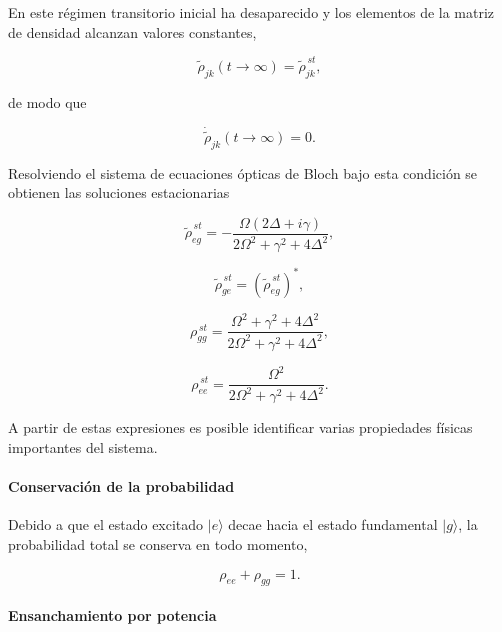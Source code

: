 \documentclass[11pt]{report}
\begin{document}
En este régimen transitorio inicial ha desaparecido y los elementos de la matriz de densidad alcanzan valores constantes,

\begin{equation}
\tilde{\rho}_{jk}(t \to \infty) = \tilde{\rho}^{\,st}_{jk},
\end{equation}

de modo que

\begin{equation}
\dot{\tilde{\rho}}_{jk}(t\to\infty)=0 .
\end{equation}

Resolviendo el sistema de ecuaciones ópticas de Bloch bajo esta condición se obtienen las soluciones estacionarias

\begin{equation}
\tilde{\rho}^{\,st}_{eg} =
-\frac{\Omega\left(2\Delta+i\gamma\right)}
{2\Omega^2+\gamma^2+4\Delta^2},
\end{equation}

\begin{equation}
\tilde{\rho}^{\,st}_{ge} =
\left(\tilde{\rho}^{\,st}_{eg}\right)^*,
\end{equation}

\begin{equation}
\rho^{\,st}_{gg} =
\frac{\Omega^2+\gamma^2+4\Delta^2}
{2\Omega^2+\gamma^2+4\Delta^2},
\end{equation}

\begin{equation}
\rho^{\,st}_{ee} =
\frac{\Omega^2}
{2\Omega^2+\gamma^2+4\Delta^2}.
\end{equation}

A partir de estas expresiones es posible identificar varias propiedades físicas importantes del sistema.

\paragraph{Conservación de la probabilidad}

Debido a que el estado excitado $|e\rangle$ decae hacia el estado fundamental $|g\rangle$, la probabilidad total se conserva en todo momento,

\begin{equation}
\rho_{ee}+\rho_{gg}=1.
\end{equation}

\paragraph{Ensanchamiento por potencia}
\end{document}

